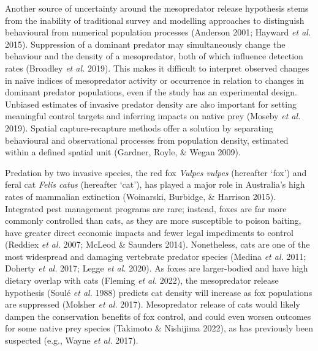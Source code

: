\documentclass[preprint, 3p, authoryear]{elsarticle} %
\begin{document}
Another source of uncertainty around the mesopredator release hypothesis stems from the inability of traditional survey and modelling approaches to distinguish behavioural from numerical population processes (Anderson 2001; Hayward \emph{et al.} 2015). Suppression of a dominant predator may simultaneously change the behaviour and the density of a mesopredator, both of which influence detection rates (Broadley \emph{et al.} 2019). This makes it difficult to interpret observed changes in naïve indices of mesopredator activity or occurrence in relation to changes in dominant predator populations, even if the study has an experimental design. Unbiased estimates of invasive predator density are also important for setting meaningful control targets and inferring impacts on native prey (Moseby \emph{et al.} 2019). Spatial capture-recapture methods offer a solution by separating behavioural and observational processes from population density, estimated within a defined spatial unit (Gardner, Royle, \& Wegan 2009).

Predation by two invasive species, the red fox \emph{Vulpes vulpes} (hereafter `fox') and feral cat \emph{Felis catus} (hereafter `cat'), has played a major role in Australia's high rates of mammalian extinction (Woinarski, Burbidge, \& Harrison 2015). Integrated pest management programs are rare; instead, foxes are far more commonly controlled than cats, as they are more susceptible to poison baiting, have greater direct economic impacts and fewer legal impediments to control (Reddiex \emph{et al.} 2007; McLeod \& Saunders 2014). Nonetheless, cats are one of the most widespread and damaging vertebrate predator species (Medina \emph{et al.} 2011; Doherty \emph{et al.} 2017; Legge \emph{et al.} 2020). As foxes are larger-bodied and have high dietary overlap with cats (Fleming \emph{et al.} 2022), the mesopredator release hypothesis (Soulé \emph{et al.} 1988) predicts cat density will increase as fox populations are suppressed (Molsher \emph{et al.} 2017). Mesopredator release of cats would likely dampen the conservation benefits of fox control, and could even worsen outcomes for some native prey species (Takimoto \& Nishijima 2022), as has previously been suspected (e.g., Wayne \emph{et al.} 2017).
\end{document}
